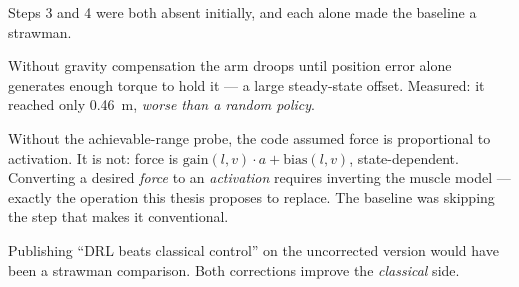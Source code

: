 \begin{trap}
Steps 3 and 4 were both absent initially, and each alone made the baseline a
strawman.

Without gravity compensation the arm droops until position error alone generates
enough torque to hold it --- a large steady-state offset. Measured: it reached
only \SI{0.46}{\meter}, \emph{worse than a random policy}.

Without the achievable-range probe, the code assumed force is proportional to
activation. It is not: force is $\text{gain}(l,v)\cdot a + \text{bias}(l,v)$,
state-dependent. Converting a desired \emph{force} to an \emph{activation}
requires inverting the muscle model --- exactly the operation this thesis
proposes to replace. The baseline was skipping the step that makes it
conventional.

Publishing ``DRL beats classical control'' on the uncorrected version would have
been a strawman comparison. Both corrections improve the \emph{classical} side.
\end{trap}
